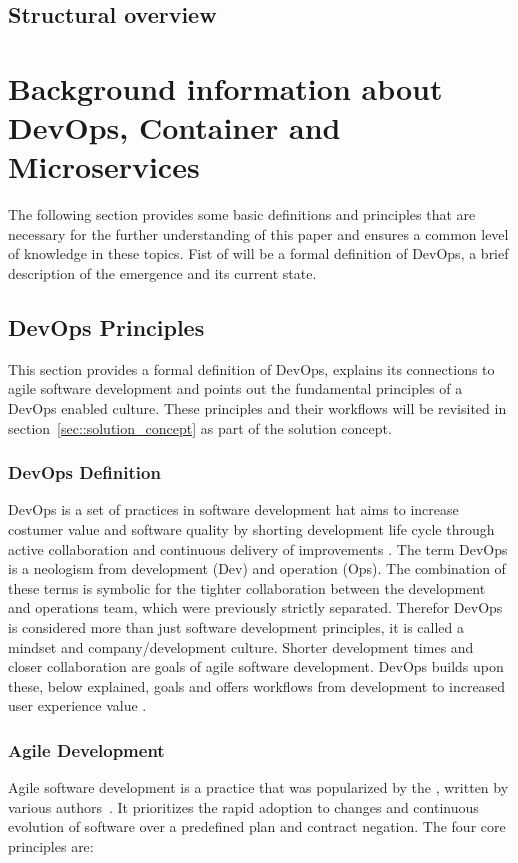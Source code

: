 \documentclass[12pt, a4paper]{article}
\begin{document}
    \subsection{Structural overview}
    \newpage
\section{Background information about DevOps, Container and Microservices}\label{sec::backgrund}
The following section provides some basic definitions and principles that are necessary for the further understanding of this paper and ensures a common level of knowledge in these topics.\newline
Fist of will be a formal definition of DevOps, a brief description of the emergence and its current state.
    \subsection{DevOps Principles}\label{ssec::devops}
    This section provides a formal definition of DevOps, explains its connections to agile software development and points out the fundamental principles of a DevOps enabled culture. These principles and their workflows will be revisited in section~\ref{sec::solution_concept} as part of the solution concept.
        \subsubsection{DevOps Definition}
        DevOps is a set of practices in software development hat aims to increase costumer value and software quality by shorting development life cycle through active collaboration and continuous delivery of improvements \cite{base_devops}. The term DevOps is a neologism from development (Dev) and operation (Ops). The combination of these terms is symbolic for the tighter collaboration between the development and operations team, which were previously strictly separated. Therefor DevOps is considered more than just software development principles, it is called a mindset and company/development culture. Shorter development times and closer collaboration are goals of agile software development. DevOps builds upon these, below explained, goals and offers workflows from development to increased user experience value \cite{azuredevops}.
        \subsubsection{Agile Development}
        Agile software development is a practice that was popularized by the , written by various authors~\cite{manifesto}. It prioritizes the rapid adoption to changes and continuous evolution of software over a predefined plan and contract negation.
        The four core principles are:
\end{document}
